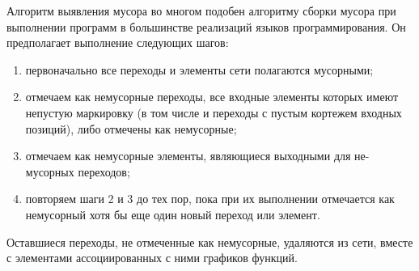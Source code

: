 	   Алгоритм выявления мусора во многом подобен алгоритму сборки мусора при выполнении программ в большинстве реализаций языков программирования. Он предполагает выполнение следующих шагов:
	   \begin{enumerate}
		   \item первоначально все переходы и элементы сети полагаются мусорными;
		   \item отмечаем как немусорные переходы, все входные элементы которых имеют непустую маркировку (в том числе и переходы с пустым кортежем входных позиций),  либо отмечены как немусорные;
		   \item отмечаем как немусорные элементы, являющиеся выходными для не-мусорных переходов;
		   \item повторяем шаги 2 и 3 до тех пор, пока при их выполнении отмечается как немусорный хотя бы еще один новый переход или элемент.
	   \end{enumerate}
	   
	   Оставшиеся переходы, не отмеченные как немусорные, удаляются из сети, вместе с элементами ассоциированных с ними графиков функций. %
